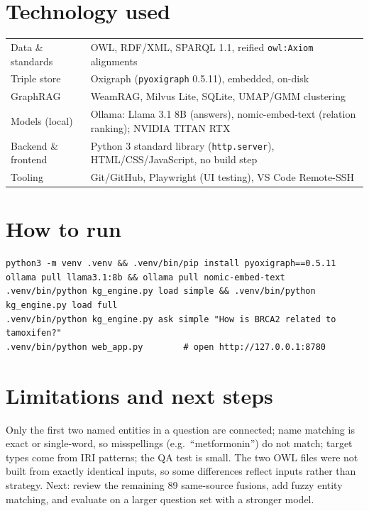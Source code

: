 \documentclass[10pt,a4paper]{article}
\newcommand{\code}[1]{\texttt{\small #1}}
\begin{document}
\section{Technology used}
\begin{tabularx}{\linewidth}{@{}lX@{}}
\toprule
Data \& standards & OWL, RDF/XML, SPARQL 1.1, reified \code{owl:Axiom} alignments \\
Triple store & Oxigraph (\code{pyoxigraph} 0.5.11), embedded, on-disk \\
GraphRAG & WeamRAG, Milvus Lite, SQLite, UMAP/GMM clustering \\
Models (local) & Ollama: Llama 3.1 8B (answers), nomic-embed-text (relation ranking); NVIDIA TITAN RTX \\
Backend \& frontend & Python 3 standard library (\code{http.server}), HTML/CSS/JavaScript, no build step \\
Tooling & Git/GitHub, Playwright (UI testing), VS Code Remote-SSH \\
\bottomrule
\end{tabularx}

\section{How to run}
\begin{verbatim}
python3 -m venv .venv && .venv/bin/pip install pyoxigraph==0.5.11
ollama pull llama3.1:8b && ollama pull nomic-embed-text
.venv/bin/python kg_engine.py load simple && .venv/bin/python kg_engine.py load full
.venv/bin/python kg_engine.py ask simple "How is BRCA2 related to tamoxifen?"
.venv/bin/python web_app.py        # open http://127.0.0.1:8780
\end{verbatim}

\section{Limitations and next steps}
Only the first two named entities in a question are connected; name matching is exact or single-word, so misspellings (e.g.\ ``metformonin'') do not match; target types come from IRI patterns; the QA test is small. The two OWL files were not built from exactly identical inputs, so some differences reflect inputs rather than strategy.
Next: review the remaining 89 same-source fusions, add fuzzy entity matching, and evaluate on a larger question set with a stronger model.
\end{document}
